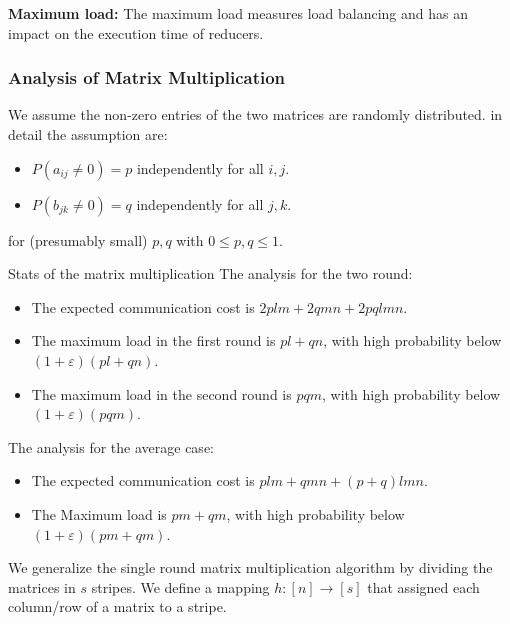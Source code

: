 \documentclass{panikzettel}
\begin{document}
\textbf{Maximum load:} The maximum load measures load balancing and has an impact on the execution time of reducers.


\subsubsection{Analysis of Matrix Multiplication}
We assume the non-zero entries of the two matrices are randomly distributed. in detail the assumption are:
\begin{itemize}
\item $P(a_{ij}\neq 0)=p$ independently for all $i,j$.
\item $P(b_{jk}\neq 0)=q$ independently for all $j,k$.
\end{itemize}
for (presumably small) $p, q$ with $0 \leq p, q \leq 1$.

\begin{theo}{Stats of the matrix multiplication}
The analysis for the two round:
\begin{itemize}[leftmargin=*]
	\item The expected communication cost is $2plm + 2qmn + 2pqlmn$.
	\item The maximum load in the first round is $pl + qn$, with high probability below $(1 + \varepsilon)(pl + qn)$.
	\item The maximum load in the second round is $pqm$, with high probability below $(1 + \varepsilon)(pqm)$.
\end{itemize}
The analysis for the average case:
\begin{itemize}[leftmargin=*]
	\item The expected communication cost is $plm + qmn + (p+q)lmn$.
	\item The Maximum load is $pm + qm$, with high probability below $(1 + \varepsilon)(pm + qm)$.
\end{itemize}
\end{theo}

We generalize the single round matrix multiplication algorithm by dividing the matrices in $s$ stripes. We define a mapping $h: [n] \rightarrow [s]$ that assigned each column/row of a matrix to a stripe.
\end{document}
